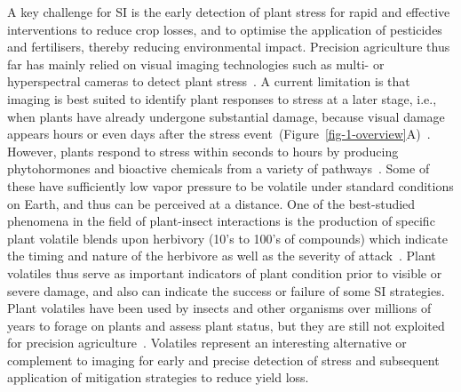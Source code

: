 A key challenge for SI is the early detection of plant stress for rapid and effective interventions to reduce crop losses, and to optimise the application of pesticides and fertilisers, thereby reducing environmental impact. Precision agriculture thus far has mainly relied on visual imaging technologies such as multi- or hyperspectral cameras to detect plant stress~\cite{Tsouros2019, Toth2016, Singh2020}. A current limitation is that imaging is best suited to identify plant responses to stress at a later stage, i.e., when plants have already undergone substantial damage, because visual damage appears hours or even days after the stress event~(Figure~\ref{fig-1-overview}A)~\cite{mahlein_hyperspectral_2018}. However, plants respond to stress within seconds to hours by producing phytohormones and bioactive chemicals from a variety of pathways~\cite{schuman_layers_2016}. Some of these have sufficiently low vapor pressure to be volatile under standard conditions on Earth, and thus can be perceived at a distance. One of the best-studied phenomena in the field of plant-insect interactions is the production of specific plant volatile blends upon herbivory (10's to 100's of compounds) which indicate the timing and nature of the herbivore as well as the severity of attack~\cite{howe_plant_2008, dicke_evolutionary_2010}. Plant volatiles thus serve as important indicators of plant condition prior to visible or severe damage, and also can indicate the success or failure of some SI strategies. Plant volatiles have been used by insects and other organisms over millions of years to forage on plants and assess plant status, but they are still not exploited for precision agriculture~\cite{turlings_tritrophic_2018}. Volatiles represent an interesting alternative or complement to imaging for early and precise detection of stress and subsequent application of mitigation strategies to reduce yield loss.

